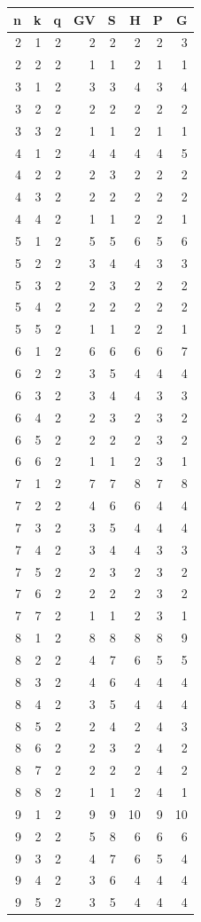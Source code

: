\begin{tabular}[t]{|r|r|r|r|r|r|r|r|}
\hline
n & k & q & GV & S & H & P & G\\
\hline
\hline
2 & 1 & 2 & 2 & 2 & 2 & 2 & 3\\
\hline
2 & 2 & 2 & 1 & 1 & 2 & 1 & 1\\
\hline
3 & 1 & 2 & 3 & 3 & 4 & 3 & 4\\
\hline
3 & 2 & 2 & 2 & 2 & 2 & 2 & 2\\
\hline
3 & 3 & 2 & 1 & 1 & 2 & 1 & 1\\
\hline
4 & 1 & 2 & 4 & 4 & 4 & 4 & 5\\
\hline
4 & 2 & 2 & 2 & 3 & 2 & 2 & 2\\
\hline
4 & 3 & 2 & 2 & 2 & 2 & 2 & 2\\
\hline
4 & 4 & 2 & 1 & 1 & 2 & 2 & 1\\
\hline
5 & 1 & 2 & 5 & 5 & 6 & 5 & 6\\
\hline
5 & 2 & 2 & 3 & 4 & 4 & 3 & 3\\
\hline
5 & 3 & 2 & 2 & 3 & 2 & 2 & 2\\
\hline
5 & 4 & 2 & 2 & 2 & 2 & 2 & 2\\
\hline
5 & 5 & 2 & 1 & 1 & 2 & 2 & 1\\
\hline
6 & 1 & 2 & 6 & 6 & 6 & 6 & 7\\
\hline
6 & 2 & 2 & 3 & 5 & 4 & 4 & 4\\
\hline
6 & 3 & 2 & 3 & 4 & 4 & 3 & 3\\
\hline
6 & 4 & 2 & 2 & 3 & 2 & 3 & 2\\
\hline
6 & 5 & 2 & 2 & 2 & 2 & 3 & 2\\
\hline
6 & 6 & 2 & 1 & 1 & 2 & 3 & 1\\
\hline
7 & 1 & 2 & 7 & 7 & 8 & 7 & 8\\
\hline
7 & 2 & 2 & 4 & 6 & 6 & 4 & 4\\
\hline
7 & 3 & 2 & 3 & 5 & 4 & 4 & 4\\
\hline
7 & 4 & 2 & 3 & 4 & 4 & 3 & 3\\
\hline
7 & 5 & 2 & 2 & 3 & 2 & 3 & 2\\
\hline
7 & 6 & 2 & 2 & 2 & 2 & 3 & 2\\
\hline
7 & 7 & 2 & 1 & 1 & 2 & 3 & 1\\
\hline
8 & 1 & 2 & 8 & 8 & 8 & 8 & 9\\
\hline
8 & 2 & 2 & 4 & 7 & 6 & 5 & 5\\
\hline
8 & 3 & 2 & 4 & 6 & 4 & 4 & 4\\
\hline
8 & 4 & 2 & 3 & 5 & 4 & 4 & 4\\
\hline
8 & 5 & 2 & 2 & 4 & 2 & 4 & 3\\
\hline
8 & 6 & 2 & 2 & 3 & 2 & 4 & 2\\
\hline
8 & 7 & 2 & 2 & 2 & 2 & 4 & 2\\
\hline
8 & 8 & 2 & 1 & 1 & 2 & 4 & 1\\
\hline
9 & 1 & 2 & 9 & 9 & 10 & 9 & 10\\
\hline
9 & 2 & 2 & 5 & 8 & 6 & 6 & 6\\
\hline
9 & 3 & 2 & 4 & 7 & 6 & 5 & 4\\
\hline
9 & 4 & 2 & 3 & 6 & 4 & 4 & 4\\
\hline
9 & 5 & 2 & 3 & 5 & 4 & 4 & 4\\
\hline
\end{tabular}
